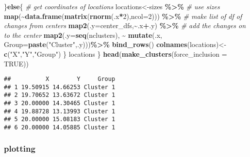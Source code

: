 \documentclass[
]{article}
\newenvironment{Shaded}{\begin{snugshade}}{\end{snugshade}}
\newcommand{\AttributeTok}[1]{\textcolor[rgb]{0.13,0.29,0.53}{#1}}
\newcommand{\CommentTok}[1]{\textcolor[rgb]{0.56,0.35,0.01}{\textit{#1}}}
\newcommand{\ConstantTok}[1]{\textcolor[rgb]{0.56,0.35,0.01}{#1}}
\newcommand{\ControlFlowTok}[1]{\textcolor[rgb]{0.13,0.29,0.53}{\textbf{#1}}}
\newcommand{\DecValTok}[1]{\textcolor[rgb]{0.00,0.00,0.81}{#1}}
\newcommand{\FunctionTok}[1]{\textcolor[rgb]{0.13,0.29,0.53}{\textbf{#1}}}
\newcommand{\NormalTok}[1]{#1}
\newcommand{\OtherTok}[1]{\textcolor[rgb]{0.56,0.35,0.01}{#1}}
\newcommand{\SpecialCharTok}[1]{\textcolor[rgb]{0.81,0.36,0.00}{\textbf{#1}}}
\newcommand{\StringTok}[1]{\textcolor[rgb]{0.31,0.60,0.02}{#1}}
\begin{document}
\begin{Shaded}
\begin{Highlighting}[]
\NormalTok{  \}}\ControlFlowTok{else}\NormalTok{\{}
    \CommentTok{\# get coordinates of locations}
\NormalTok{    locations}\OtherTok{\textless{}{-}}\NormalTok{sizes }\SpecialCharTok{\%\textgreater{}\%} \CommentTok{\# use sizes}
      \FunctionTok{map}\NormalTok{(}\SpecialCharTok{\textasciitilde{}}\FunctionTok{data.frame}\NormalTok{(}\FunctionTok{matrix}\NormalTok{(}\FunctionTok{rnorm}\NormalTok{(.x}\SpecialCharTok{*}\DecValTok{2}\NormalTok{),}\AttributeTok{ncol=}\DecValTok{2}\NormalTok{))) }\SpecialCharTok{\%\textgreater{}\%} \CommentTok{\# make list of df of changes from centers}
      \FunctionTok{map2}\NormalTok{(}\AttributeTok{.y=}\NormalTok{center\_dfs,}\SpecialCharTok{\textasciitilde{}}\NormalTok{.x}\SpecialCharTok{+}\NormalTok{.y) }\SpecialCharTok{\%\textgreater{}\%} \CommentTok{\# add the changes on to the center}
      \FunctionTok{map2}\NormalTok{(}\AttributeTok{.y=}\FunctionTok{seq}\NormalTok{(nclusters), }\SpecialCharTok{\textasciitilde{}} \FunctionTok{mutate}\NormalTok{(.x, }\AttributeTok{Group=}\FunctionTok{paste}\NormalTok{(}\StringTok{"Cluster"}\NormalTok{,.y)))}\SpecialCharTok{\%\textgreater{}\%}
      \FunctionTok{bind\_rows}\NormalTok{()}
    \FunctionTok{colnames}\NormalTok{(locations)}\OtherTok{\textless{}{-}}\FunctionTok{c}\NormalTok{(}\StringTok{"X"}\NormalTok{,}\StringTok{"Y"}\NormalTok{,}\StringTok{"Group"}\NormalTok{)}
\NormalTok{  \}}
\NormalTok{  locations}
\NormalTok{\}}
\FunctionTok{head}\NormalTok{(}\FunctionTok{make\_clusters}\NormalTok{(}\AttributeTok{force\_inclusion =} \ConstantTok{TRUE}\NormalTok{))}
\end{Highlighting}
\end{Shaded}

\begin{verbatim}
##          X        Y     Group
## 1 19.50915 14.66253 Cluster 1
## 2 19.70652 13.63672 Cluster 1
## 3 20.00000 14.30465 Cluster 1
## 4 19.88728 13.13993 Cluster 1
## 5 20.00000 15.08183 Cluster 1
## 6 20.00000 14.05885 Cluster 1
\end{verbatim}

\subsubsection{plotting}\label{plotting}
\end{document}
